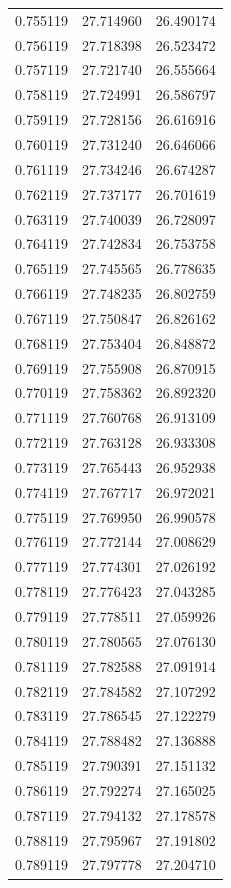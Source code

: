 \begin{tabular}{rrr}
0.755119 & 27.714960 & 26.490174 \\
0.756119 & 27.718398 & 26.523472 \\
0.757119 & 27.721740 & 26.555664 \\
0.758119 & 27.724991 & 26.586797 \\
0.759119 & 27.728156 & 26.616916 \\
0.760119 & 27.731240 & 26.646066 \\
0.761119 & 27.734246 & 26.674287 \\
0.762119 & 27.737177 & 26.701619 \\
0.763119 & 27.740039 & 26.728097 \\
0.764119 & 27.742834 & 26.753758 \\
0.765119 & 27.745565 & 26.778635 \\
0.766119 & 27.748235 & 26.802759 \\
0.767119 & 27.750847 & 26.826162 \\
0.768119 & 27.753404 & 26.848872 \\
0.769119 & 27.755908 & 26.870915 \\
0.770119 & 27.758362 & 26.892320 \\
0.771119 & 27.760768 & 26.913109 \\
0.772119 & 27.763128 & 26.933308 \\
0.773119 & 27.765443 & 26.952938 \\
0.774119 & 27.767717 & 26.972021 \\
0.775119 & 27.769950 & 26.990578 \\
0.776119 & 27.772144 & 27.008629 \\
0.777119 & 27.774301 & 27.026192 \\
0.778119 & 27.776423 & 27.043285 \\
0.779119 & 27.778511 & 27.059926 \\
0.780119 & 27.780565 & 27.076130 \\
0.781119 & 27.782588 & 27.091914 \\
0.782119 & 27.784582 & 27.107292 \\
0.783119 & 27.786545 & 27.122279 \\
0.784119 & 27.788482 & 27.136888 \\
0.785119 & 27.790391 & 27.151132 \\
0.786119 & 27.792274 & 27.165025 \\
0.787119 & 27.794132 & 27.178578 \\
0.788119 & 27.795967 & 27.191802 \\
0.789119 & 27.797778 & 27.204710 \\

\end{tabular}
